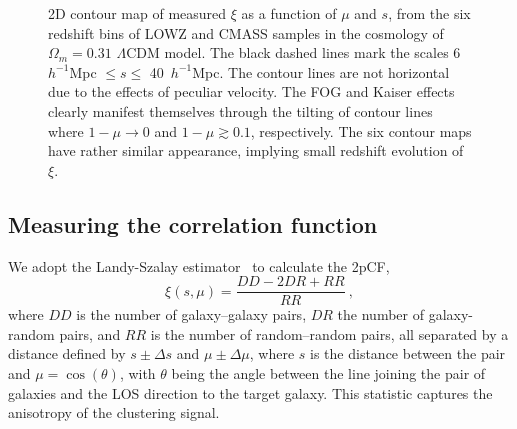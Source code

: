 \documentclass[iop]{emulateapj}
\begin{document}
\begin{figure}
   \centering{
   }
   \caption{
    \label{fig_2pcfcon} 
    2D contour map of measured $\xi$ as a function of $\mu$ and $s$, from the six redshift bins of LOWZ and CMASS samples 
      in the cosmology of $\Omega_m=0.31$ $\Lambda$CDM model.
    The black dashed lines mark the scales 6\ $h^{-1}$Mpc $\leq s\leq$ 40\ $h^{-1}$Mpc.
    The contour lines are not horizontal due to the effects of peculiar velocity.
    The FOG and Kaiser effects clearly manifest themselves through the tilting of contour 
     lines where $1-\mu \rightarrow 0$ and $1-\mu \gtrsim0.1$, respectively.
    The six contour maps have rather similar appearance, implying small redshift evolution of $\xi$.
   }
\end{figure}

\subsection{Measuring the correlation function}

We adopt the Landy-Szalay estimator~\citep{1993ApJ...412...64L} to calculate the 2pCF,
\begin{equation}
\xi(s,\mu)=\frac{DD-2DR+RR}{RR}\ ,
\end{equation}
where $DD$ is the number of galaxy--galaxy pairs, 
$DR$ the number of galaxy-random pairs, 
and $RR$ is the number of random--random pairs, 
all separated by a distance defined by $s\pm\Delta s$ and $\mu\pm\Delta\mu$, 
where $s$ is the distance between the pair and $\mu=\cos(\theta)$, 
with $\theta$ being the angle between the line joining the pair of galaxies and the LOS direction to the target galaxy. 
This statistic captures the anisotropy of the clustering signal.
\end{document}
